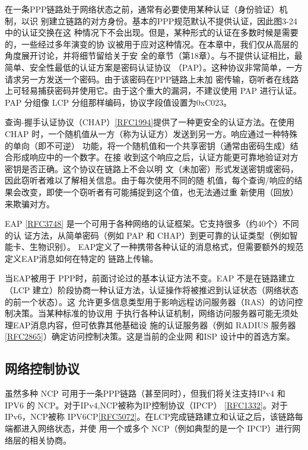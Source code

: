 在一条PPP链路处于网络状态之前，通常有必要使用某种认证（身份验证）机制，以识
别建立链路的对方身份。基本的PPP规范默认不提供认证，因此图3-24中的认证交换在这
种情况下不会出现。但是，某种形式的认证在多数时候是需要的，一些经过多年演变的协
议被用于应对这种情况。在本章中，我们仅从高层的角度展开讨论，并将细节留给关于安
全的章节（第18章）。与不提供认证相比，最简单、安全性最低的认证方案是密码认证协议
（PAP）。这种协议非常简单，一方请求另一方发送一个密码。由于该密码在PPP链路上未加
密传输，窃听者在线路上可轻易捕获密码并使用它。由于这个重大的漏洞，不建议使用 PAP
进行认证。PAP 分组像 LCP 分组那样编码，协议字段值设置为0xC023。

查询-握手认证协议（CHAP）\href{https://www.rfc-editor.org/rfc/rfc1994}{[RFC1994]}提供了一种更安全的认证方法。在使用 CHAP
时，一个随机值从一方（称为认证方）发送到另一方。响应通过一种特殊的单向（即不可逆）
功能，将一个随机值和一个共享密钥（通常由密码生成）结合形成响应中的一个数字。在接
收到这个响应之后，认证方能更可靠地验证对方密钥是否正确。这个协议在链路上不会以明
文（未加密）形式发送密钥或密码，因此窃听者难以了解相关信息。由于每次使用不同的随
机值，每个查询/响应的结果会改变，即使一个窃听者有可能捕捉到这个值，也无法通过重
新使用（回放）来欺骗对方。

EAP \href{https://www.rfc-editor.org/rfc/rfc3748}{[RFC3748]} 是一个可用于各种网络的认证框架。它支持很多（约40个）不同的认
证方法，从简单密码（例如 PAP 和 CHAP）到更可靠的认证类型（例如智能卡、生物识别）。
EAP定义了一种携带各种认证的消息格式，但需要额外的规范定义EAP消息如何在特定的
链路上传输。

当EAP被用于 PPP时，前面讨论过的基本认证方法不变。EAP 不是在链路建立（LCP
建立）阶段协商一种认证方法，认证操作将被推迟到认证状态（网络状态的前一个状态）。这
允许更多信息类型用于影响远程访问服务器（RAS）的访问控制决策。当某种标准的协议用
于执行各种认证机制，网络访问服务器可能无须处理EAP消息内容，但可依靠其他基础设
施的认证服务器（例如 RADIUS 服务器\href{https://www.rfc-editor.org/rfc/rfc2865}{[RFC2865]}）确定访问控制决策。这是当前的企业网
和ISP 设计中的首选方案。

\subsection{网络控制协议}

虽然多种 NCP 可用于一条PPP链路（甚至同时），但我们将关注支持IPv4 和IPV6 的
NCP。对于IPv4,NCP被称为IP控制协议（IPCP） \href{https://www.rfc-editor.org/rfc/rfc1332}{[RFC1332]}。对于 IPv6，NCP被称
IPV6CP\href{https://www.rfc-editor.org/rfc/rfc5072}{[RFC5072]}。在LCP完成链路建立和认证之后，该链路每端都进入网络状态，并使
用一个或多个 NCP（例如典型的是一个 IPCP）进行网络层的相关协商。

